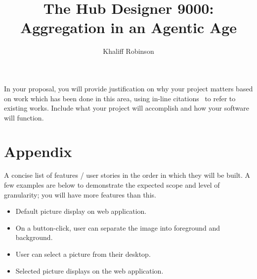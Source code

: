 \documentclass[12pt]{article}
\title{\textbf{The Hub Designer 9000: Aggregation in an Agentic Age}}
\author{Khaliff Robinson}
\begin{document}
\maketitle

In your proposal, you will provide justification on why your project matters based on work which has been done in this area, using in-line citations~\cite{clrsAlgorithms} to refer to existing works. Include what your project will accomplish and how your software will function. 


\newpage
\section*{Appendix}
A concise list of features / user stories in the order in which they will be built. A few examples are below to demonstrate the expected scope and level of granularity; you will have more features than this.
\begin{itemize}
	\item Default picture display on web application.
	\item On a button-click, user can separate the image into foreground and background.
	\item User can select a picture from their desktop.
	\item Selected picture displays on the web application.
\end{itemize}




\end{document}
